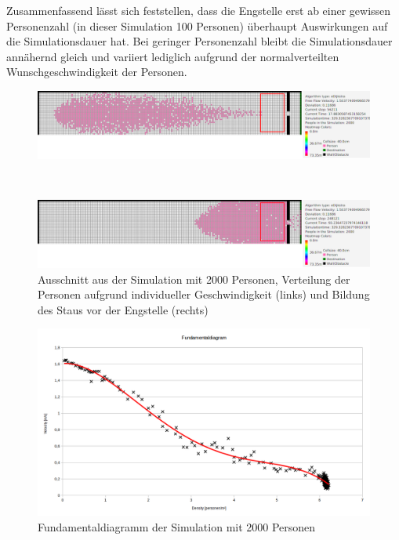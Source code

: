 Zusammenfassend lässt sich feststellen, dass die Engstelle erst ab einer gewissen Personenzahl (in dieser Simulation 100 Personen) überhaupt Auswirkungen auf die Simulationsdauer hat. Bei geringer Personenzahl bleibt die Simulationsdauer annähernd gleich und variiert lediglich aufgrund der normalverteilten Wunschgeschwindigkeit der Personen. 









\begin{figure}
\centering
\begin{minipage}{1\textwidth}
\centering
  \includegraphics[width=1\linewidth]{abbildungen/engstelle/2000P/engstelle2000personenVORmessbereich.png}
\end{minipage}%
\\
\begin{minipage}{1\textwidth}
\centering
  \includegraphics[width=1\linewidth]{abbildungen/engstelle/2000P/engstelle2000personenMAXmessbereich.png} 
 \end{minipage}
\caption{Ausschnitt aus der Simulation mit 2000 Personen, Verteilung der Personen aufgrund individueller Geschwindigkeit (links) und Bildung des Staus vor der Engstelle (rechts)}
\label{fig:engstelle2000p}
\end{figure}

\begin{figure}[ht]
	\centering
  \includegraphics[width=\textwidth]{abbildungen/engstelle/2000P/fundamentalDiagram2000persons.png}
	\caption{Fundamentaldiagramm der Simulation mit 2000 Personen}
	\label{fig:engstelle2000pFUNDA}
\end{figure}

